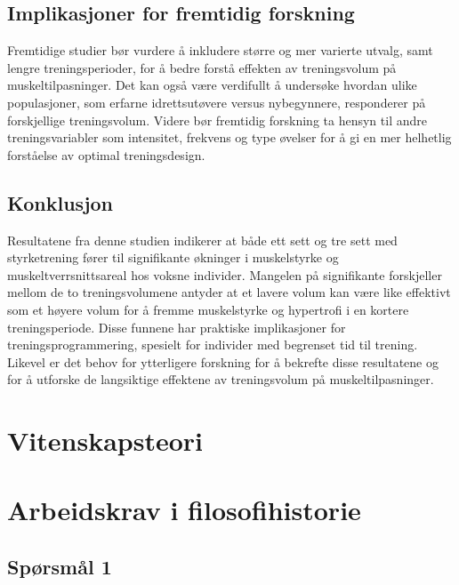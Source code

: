 \documentclass[
  letterpaper,
  DIV=11,
  numbers=noendperiod]{scrreprt}
\begin{document}
\section{Implikasjoner for fremtidig
forskning}\label{implikasjoner-for-fremtidig-forskning}

Fremtidige studier bør vurdere å inkludere større og mer varierte
utvalg, samt lengre treningsperioder, for å bedre forstå effekten av
treningsvolum på muskeltilpasninger. Det kan også være verdifullt å
undersøke hvordan ulike populasjoner, som erfarne idrettsutøvere versus
nybegynnere, responderer på forskjellige treningsvolum. Videre bør
fremtidig forskning ta hensyn til andre treningsvariabler som
intensitet, frekvens og type øvelser for å gi en mer helhetlig
forståelse av optimal treningsdesign.

\section{Konklusjon}\label{konklusjon-1}

Resultatene fra denne studien indikerer at både ett sett og tre sett med
styrketrening fører til signifikante økninger i muskelstyrke og
muskeltverrsnittsareal hos voksne individer. Mangelen på signifikante
forskjeller mellom de to treningsvolumene antyder at et lavere volum kan
være like effektivt som et høyere volum for å fremme muskelstyrke og
hypertrofi i en kortere treningsperiode. Disse funnene har praktiske
implikasjoner for treningsprogrammering, spesielt for individer med
begrenset tid til trening. Likevel er det behov for ytterligere
forskning for å bekrefte disse resultatene og for å utforske de
langsiktige effektene av treningsvolum på muskeltilpasninger.


\chapter{Vitenskapsteori}\label{vitenskapsteori}


\chapter{Arbeidskrav i
filosofihistorie}\label{arbeidskrav-i-filosofihistorie}

\section{Spørsmål 1}\label{spuxf8rsmuxe5l-1}
\end{document}

